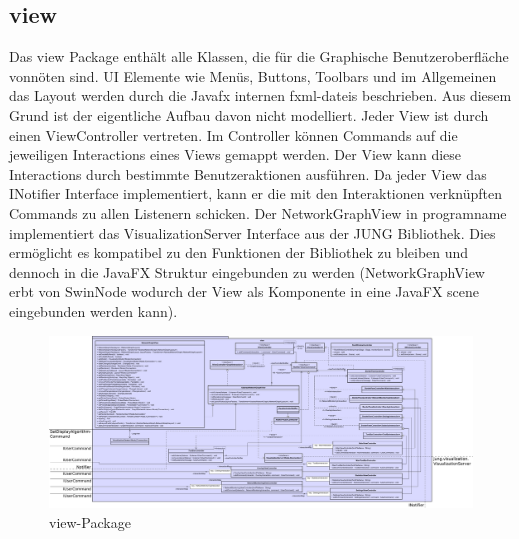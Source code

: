 \subsection{view}
\label{subsec:view}

Das view Package enthält alle Klassen, die für die Graphische Benutzeroberfläche vonnöten sind. UI Elemente wie Menüs, Buttons, Toolbars und im Allgemeinen das Layout werden durch die Javafx internen \glspl{fxml-datei} beschrieben. Aus diesem Grund ist der eigentliche Aufbau davon nicht modelliert.
Jeder View ist durch einen ViewController vertreten. Im Controller können Commands auf die jeweiligen Interactions eines Views gemappt werden. Der View kann diese Interactions durch bestimmte Benutzeraktionen ausführen. Da jeder View das INotifier Interface implementiert, kann er die mit den Interaktionen verknüpften Commands zu allen Listenern schicken.
Der NetworkGraphView in \gls{programname} implementiert das VisualizationServer Interface aus der JUNG Bibliothek. Dies ermöglicht es kompatibel zu den Funktionen der Bibliothek zu bleiben und dennoch in die JavaFX Struktur eingebunden zu werden (NetworkGraphView erbt von SwinNode wodurch der View als Komponente in eine JavaFX scene eingebunden werden kann).

\clearpage
\begin{figure}
  \centering
  \includegraphics[width=\textwidth]{../diagramimages/view.png}
  \caption{view-Package}
\end{figure}
\clearpage
